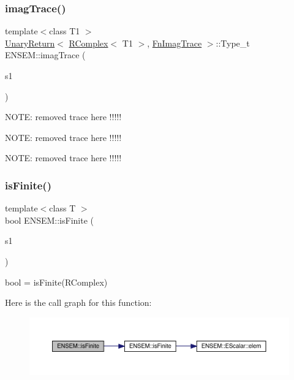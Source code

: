 \mbox{\label{group__rcomplex_ga57832278e9583a5d6e01e547dfdbb896}} 
\subsubsection{\texorpdfstring{imagTrace()}{imagTrace()}}
{\footnotesize\ttfamily template$<$class T1 $>$ \\
\mbox{\hyperlink{structENSEM_1_1UnaryReturn}{Unary\+Return}}$<$ \mbox{\hyperlink{classENSEM_1_1RComplex}{R\+Complex}}$<$ T1 $>$, \mbox{\hyperlink{structENSEM_1_1FnImagTrace}{Fn\+Imag\+Trace}} $>$\+::Type\+\_\+t E\+N\+S\+E\+M\+::imag\+Trace (\begin{DoxyParamCaption}\item[{const \mbox{\hyperlink{classENSEM_1_1RComplex}{R\+Complex}}$<$ T1 $>$ \&}]{s1 }\end{DoxyParamCaption})\hspace{0.3cm}{\ttfamily [inline]}}

N\+O\+TE\+: removed trace here !!!!!

N\+O\+TE\+: removed trace here !!!!!

N\+O\+TE\+: removed trace here !!!!! \mbox{\label{group__rcomplex_ga3152e73aedd89eafdfab17e0cb0363b5}} 
\subsubsection{\texorpdfstring{isFinite()}{isFinite()}}
{\footnotesize\ttfamily template$<$class T $>$ \\
bool E\+N\+S\+E\+M\+::is\+Finite (\begin{DoxyParamCaption}\item[{const \mbox{\hyperlink{classENSEM_1_1RComplex}{R\+Complex}}$<$ T $>$ \&}]{s1 }\end{DoxyParamCaption})}



bool = is\+Finite(\+R\+Complex) 

Here is the call graph for this function\+:\nopagebreak
\begin{figure}[H]
\begin{center}
\leavevmode
\includegraphics[width=350pt]{da/dc7/group__rcomplex_ga3152e73aedd89eafdfab17e0cb0363b5_cgraph}
\end{center}
\end{figure}
\mbox{\label{group__rcomplex_gabf9e4d305784028c682bdf06201dba86}} 
